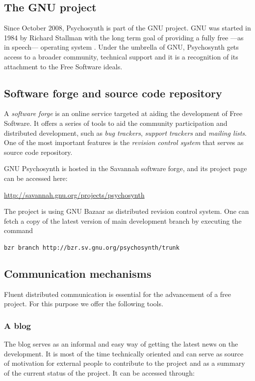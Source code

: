 \subsection{The GNU project}

Since October 2008, Psychosynth is part of the GNU project. GNU was
started in 1984 by Richard Stallman with the long term goal of
providing a fully free ---as in speech--- operating
system \cite{stallman2002free}. Under the umbrella of GNU, Psychosynth
gets access to a broader community, technical support and it is a
recognition of its attachment to the Free Software ideals.

\subsection{Software forge and source code repository}

A \emph{software forge} is an online service targeted at aiding the
development of Free Software. It offers a series of tools to aid the
community participation and distributed development, such as \emph{bug
trackers}, \emph{support trackers} and \emph{mailing lists}. One of
the most important features is the \emph{revision control system} that
serves as source code repository.

GNU Psychosynth is hosted in the Savannah software forge, and its
project page can be accessed here:

\url{http://savannah.gnu.org/projects/psychosynth}

The project is using GNU Bazaar as distributed revision control
system. One can fetch a copy of the latest version of main development
branch by executing the command\:

\verb!bzr branch http://bzr.sv.gnu.org/psychosynth/trunk!

\subsection{Communication mechanisms}

Fluent distributed communication is essential for the advancement of a
free project. For this purpose we offer the following tools.

\subsubsection{A blog}

The blog serves as an informal and easy way of getting the latest news
on the development. It is most of the time technically oriented and
can serve as source of motivation for external people to contribute to the
project and as a summary of the current status of the project. It can
be accessed through: 

